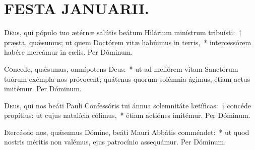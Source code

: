 \documentclass[vesperale_romanum.tex]{subfiles}
\begin{document}
\section[Festa Januarii]{FESTA JANUARII.}


\duplexmtv


\oratio

\lettrine{D}{e}us, qui pópulo tuo ætérnæ salútis beátum Hilárium minístrum tribuísti:~† præsta, quǽsumus; ut quem Do\-ctórem vitæ habúimus in terris,~* intercessórem habére mereámur in cælis.
Per Dóminum.


\oratio

\lettrine{C}{o}ncede, quǽsumus, omnípotens Deus:~* ut ad meliórem vitam Sanctórum tuórum exémpla nos próvocent; quátenus quorum solémnia ágimus, étiam actus imitémur.
Per Dóminum.

\myrule


\duplexmtv

\oratio

\lettrine{D}{e}us, qui nos beáti Pauli Confessóris tui ánnua sole\-mnitáte lætíficas:~† concéde propítius: ut cujus natalícia cólimus,~* étiam actiónes imitémur. Per Dóminum.




\oratio

\lettrine{I}{n}ercéssio nos, quǽsumus Dómine, beáti Mauri Abbátis comméndet:~* ut quod nostris méritis non valémus, ejus patrocínio assequámur.
Per Dóminum.
\end{document}
